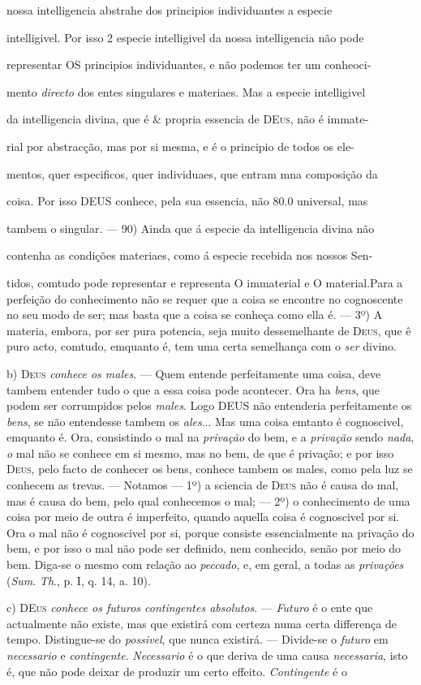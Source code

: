 nossa intelligencia abstrahe dos principios individuantes a especie\par intelligivel. Por isso 2 especie intelligivel da nossa intelligencia não pode\par representar OS principios individuantes, e não podemos ter um conheoci-\par mento \emph{directo} dos entes singulares e materiaes. Mas a especie intelligivel\par da intelligencia divina, que é \& propria essencia de \textsc{DEus}, não é immate-\par rial por abstracção, mas por si mesma, e é o principio de todos os ele-\par mentos, quer especificos, quer individuaes, que entram mna composição da\par coisa. Por isso \textsc{DEUS} conhece, pela sua essencia, não 80.0 universal, mas\par tambem o singular. --- 90) Ainda que á especie da intelligencia divina não\par contenha as condições materiaes, como á especie recebida nos nossos Sen-\par tidos, comtudo pode representar e representa O immaterial e O material.Para a perfeição do conhecimento não se requer que a coisa se encontre no cognoscente no seu modo de ser; mas basta que a coisa se conheça como ella é. --- 3º) A materia, embora, por ser pura potencia, seja muito dessemelhante de \textsc{Deus}, que ê puro acto, comtudo, emquanto é, tem uma certa semelhança com o \emph{ser} divino.\par b) \textsc{Deus} \emph{conhece os males}. --- Quem entende perfeitamente uma coisa, deve tambem entender tudo o que a essa coisa pode acontecer. Ora ha \emph{bens}, que podem ser corrumpidos pelos \emph{males}. Logo \textsc{DEUS} não entenderia perfeitamente os \emph{bens}, se não entendesse tambem os \emph{ales}... Mas uma coisa emtanto é cognoscivel, emquanto é. Ora, consistindo o mal na \emph{privação} do bem, e a \emph{privação} sendo \emph{nada}, \emph{o} mal não se conhece em si mesmo, mas no bem, de que é privação; e por isso \textsc{Deus}, pelo facto de conhecer os bens, conhece tambem os males, como pela luz se conhecem as trevas. --- Notamos --- 1º) a sciencia de \textsc{Deus} não é causa do mal, mas é causa do bem, pelo qual conhecemos o mal; --- 2º) o conhecimento de uma coisa por meio de outra é imperfeito, quando aquella coisa é cognoscivel por si. Ora o mal não é cognoscivel por si, porque consiste essencialmente na privação do bem, e por isso o mal não pode ser definido, nem conhecido, senão por meio do bem. Diga-se o mesmo com relação ao \emph{peccado}, e, em geral, a todas as \emph{privações} (\emph{Sum}. \emph{Th}., p. I, q. 14, a. 10).\par c) \textsc{DEus} \emph{conhece os futuros contingentes absolutos}. --- \emph{Futuro} é o ente que actualmente não existe, mas que existirá com certeza numa certa differença de tempo. Distingue-se do \emph{possivel}, que nunca existirá. --- Divide-se o \emph{futuro} em \emph{necessario} e \emph{contingente}. \emph{Necessario} é o que deriva de uma causa \emph{necessaria}, isto é, que não pode deixar de produzir um certo effeito. \emph{Contingente} é o 